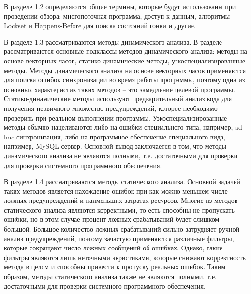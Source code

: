 В разделе 1.2 определяются общие термины, которые будут использованы при проведении обзора: многопоточная программа, доступ к данным, алгоритмы Lockset и Happens-Before для поиска состояний гонки и другие.

В разделе 1.3 рассматриваются методы динамического анализа.
В разделе рассматриваются основные подклассы методов динамического анализа: методы на основе векторных часов, статико-динамические методы, узкоспециализированные методы.
Методы динамического анализа на основе векторных часов применяются для поиска ошибок синхронизации во время работы программы, поэтому одна из основных характеристик таких методов -- это замедление целевой программы. 
Статико-динамические методы используют предварительный анализ кода для получения первичного множество предупреждений, которое необходимо проверить при реальном выполнении программы.
Узкоспециализированные методы обычно нацеливаются либо на ошибки специального типа, например, ad-hoc синхронизации, либо на программное обеспечение специального вида, например, MySQL сервер.
Основной вывод заключается в том, что методы динамического анализа не являются полными, т.е. достаточными для проверки для проверки системного программного обеспечения.

В разделе 1.4 рассматриваются методы статического анализа.
Основной задачей таких методов является нахождение ошибок при как можно меньшем числе ложных предупреждений и наименьших затратах ресурсов. 
Многие из методов статического анализа являются корректными, то есть способны не пропускать ошибки, но в этом случае процент ложных срабатываний будет слишком большой.
Большое количество ложных срабатываний сильно затрудняет ручной анализ предупреждений, поэтому зачастую применяются различные фильтры, которые сокращают число ложных сообщений об ошибках.
Однако, такие фильтры являются лишь неточными эвристиками, которые снижают корректность метода в целом и способны привести к пропуску реальных ошибок.
Таким образом, методы статического анализа также не являются полными, т.е. достаточными для проверки системного программного обеспечения.

